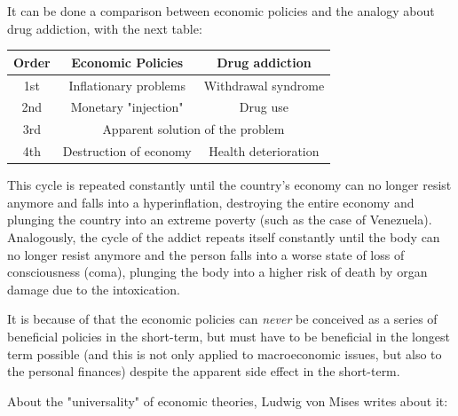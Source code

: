 \documentclass[12pt,a4paper,twoside]{book}
\begin{document}
It can be done a comparison between economic policies and the analogy about drug addiction, with the next table:

\begin{center}
\begin{tabular}{|c|c|c|}
\hline 
\textbf{Order} & \textbf{Economic Policies} & \textbf{Drug addiction} \\ 
\hline 
1st & Inflationary problems & Withdrawal syndrome  \\ 
\hline 
2nd & Monetary "injection" & Drug use \\ 
\hline 
3rd & \multicolumn{2}{|c|}{Apparent solution of the problem} \\ 
\hline 
4th & Destruction of economy & Health deterioration \\ 
\hline 
\end{tabular} 
\end{center}

This cycle is repeated constantly until the country's economy can no longer resist anymore and falls into a hyperinflation, destroying the entire economy and plunging the country into an extreme poverty (such as the case of Venezuela). Analogously, the cycle of the addict repeats itself constantly until the body can no longer resist anymore and the person falls into a worse state of loss of consciousness (coma), plunging the body into a higher risk of death by organ damage due to the intoxication.

It is because of that the economic policies can \textit{never} be conceived as a series of beneficial policies in the short-term, but must have to be beneficial in the longest term possible (and this is not only applied to macroeconomic issues, but also to the personal finances) despite the apparent side effect in the short-term.

About the "universality" of economic theories, Ludwig von Mises writes about it:
\end{document}
